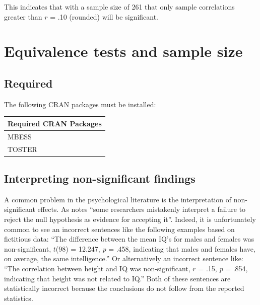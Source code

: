\documentclass[
]{krantz}
\begin{document}
This indicates that with a sample size of 261 that only sample correlations greater than \(r\) = .10 (rounded) will be significant.

\hypertarget{equivalence-tests-and-sample-size}{%
\chapter{Equivalence tests and sample size}\label{equivalence-tests-and-sample-size}}

\hypertarget{required-5}{%
\section{Required}\label{required-5}}

The following CRAN packages must be installed:

\begin{longtable}[]{@{}l@{}}
\toprule
Required CRAN Packages \\
\midrule
\endhead
MBESS \\
TOSTER \\
\bottomrule
\end{longtable}

\hypertarget{interpreting-non-significant-findings}{%
\section{Interpreting non-significant findings}\label{interpreting-non-significant-findings}}

A common problem in the psychological literature is the interpretation of non-significant effects. As \citep[Kirk][]{kirk1996practical} notes ``some researchers mistakenly interpret a failure to reject the null hypothesis as evidence for accepting it''. Indeed, it is unfortunately common to see an incorrect sentences like the following examples based on fictitious data: ``The difference between the mean IQ's for males and females was non-significant, \(t\)(98) = 12.247, \emph{p} = .458, indicating that males and females have, on average, the same intelligence.'' Or alternatively an incorrect sentence like: ``The correlation between height and IQ was non-significant, \(r\) = .15, \emph{p} = .854, indicating that height was not related to IQ.'' Both of these sentences are statistically incorrect because the conclusions do not follow from the reported statistics.
\end{document}
